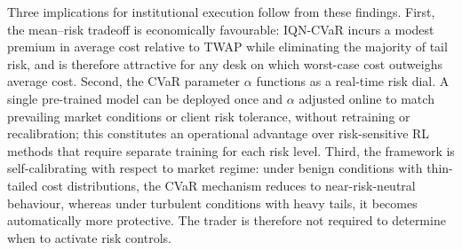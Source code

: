 \documentclass[11pt]{article}
\begin{document}
Three implications for institutional execution follow from these findings.
First, the mean--risk tradeoff is economically favourable: IQN-CVaR incurs
a modest premium in average cost relative to TWAP while eliminating the
majority of tail risk, and is therefore attractive for any desk on which
worst-case cost outweighs average cost. Second, the CVaR parameter
$\alpha$ functions as a real-time risk dial. A single pre-trained model can
be deployed once and $\alpha$ adjusted online to match prevailing market
conditions or client risk tolerance, without retraining or recalibration;
this constitutes an operational advantage over risk-sensitive RL methods
that require separate training for each risk level. Third, the framework
is self-calibrating with respect to market regime: under benign conditions
with thin-tailed cost distributions, the CVaR mechanism reduces to
near-risk-neutral behaviour, whereas under turbulent conditions with heavy
tails, it becomes automatically more protective. The trader is therefore
not required to determine when to activate risk controls.




\end{document}
